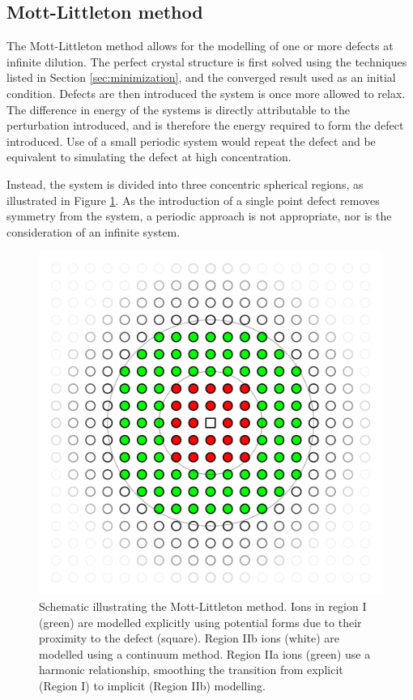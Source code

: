 \subsection{Mott-Littleton method}
The Mott-Littleton method allows for the modelling of one or more defects at infinite dilution.
The perfect crystal structure is first solved using the techniques listed in Section \ref{sec:minimization}, and the converged result used as an initial condition.
Defects are then introduced the system is once more allowed to relax.
The difference in energy of the systems is directly attributable to the perturbation introduced, and is therefore the energy required to form the defect introduced.
Use of a small periodic system would repeat the defect and be equivalent to simulating the defect at high concentration.

Instead, the system is divided into three concentric spherical regions, as illustrated in Figure \ref{fig:mott}.
As the introduction of a single point defect removes symmetry from the system, a periodic approach is not appropriate, nor is the consideration of an infinite system.

\begin{figure}
  \centering
  \includegraphics[width = \linewidth]{figures/mott/mott}
  \caption[Mott-Littleton method schematic]{Schematic illustrating the Mott-Littleton method. Ions in region I (green) are modelled explicitly using potential forms due to their proximity to the defect (square). Region IIb ions (white) are modelled using a continuum method. Region IIa ions (green) use a harmonic relationship, smoothing the transition from explicit (Region I) to implicit (Region IIb) modelling.}
  \label{fig:mott}
\end{figure}

